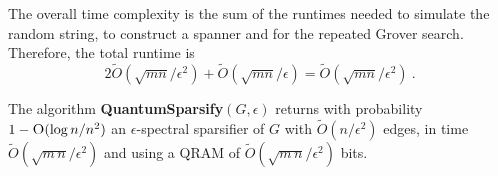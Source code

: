 The overall time complexity is the sum of the runtimes needed to simulate the random string, to construct a spanner and for the repeated Grover search. Therefore, the total runtime is 
$$2 \tilde{O}(\sqrt{mn}/\epsilon^2) + \tilde{O}(\sqrt{mn}/\epsilon) = \tilde{O}(\sqrt{mn}/\epsilon^2) \ . $$ 


\begin{theorem} \label{th:qu-spectral-sparsification}
The algorithm \textbf{QuantumSparsify}$(G,\epsilon)$ returns with probability $1-\textsc{O}(\log n/n^2)$ an $\epsilon$-spectral sparsifier of $G$ with $\tilde{O}(n/\epsilon^2)$ edges, in time $\tilde{O}(\sqrt{m\,n}/\epsilon^2)$ and using a QRAM of $\tilde{O}(\sqrt{m\,n}/\epsilon^2)$ bits. 
\end{theorem}

